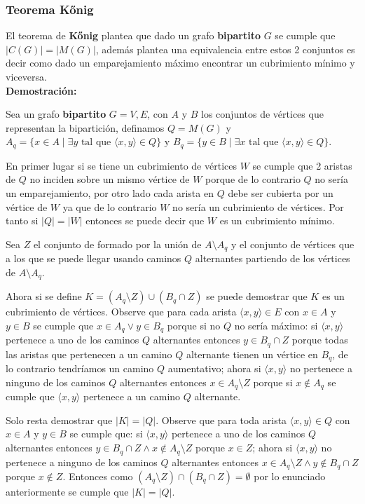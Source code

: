 \documentclass{article}
\begin{document}
\subsubsection{Teorema Kőnig}

El teorema de \textbf{Kőnig} plantea que dado un grafo \textbf{bipartito} $G$ se cumple que $|C(G)|=|M(G)|$, además plantea una equivalencia
entre estos 2 conjuntos es decir como dado un emparejamiento máximo encontrar un cubrimiento mínimo y viceversa.\\

\textbf{Demostración:}

Sea un grafo \textbf{bipartito} $G=V,E$, con $A$ y $B$ los conjuntos de vértices que representan la bipartición, definamos $Q = M(G)$ y
$A_q = \{ x \in A \mid \exists y \text{ tal que } \langle x, y \rangle \in Q \}$
y $B_q = \{ y \in B \mid \exists x \text{ tal que } \langle x, y \rangle \in Q \}$.

En primer lugar si se tiene un cubrimiento de vértices $W$ se cumple que 2 aristas de $Q$ no inciden
sobre un mismo vértice de $W$ porque de lo contrario $Q$ no sería un emparejamiento, por otro lado cada arista en $Q$ debe ser
cubierta por un vértice de $W$ ya que de lo contrario $W$ no sería un cubrimiento de vértices. Por tanto si $|Q|=|W|$ entonces se puede
decir que $W$ es un cubrimiento mínimo.

Sea $Z$ el conjunto de formado por la unión de $A \setminus A_q$ y el conjunto de vértices que a los que se puede llegar usando
caminos $Q$ alternantes partiendo de los vértices de $A \setminus A_q$.

Ahora si se define $K = (A_q\setminus Z) \cup (B_q \cap Z)$ se puede demostrar que $K$ es un cubrimiento de vértices. Observe que
para cada arista $\langle x, y \rangle \in E$ con $x\in A$ y $y\in B$ se cumple que $x \in A_q \vee y \in B_q$ porque si no $Q$
no sería máximo: si $\langle x, y \rangle$ pertenece a uno de los caminos $Q$ alternantes entonces $y \in B_q \cap Z$ porque todas las aristas
que pertenecen a un camino $Q$ alternante tienen un vértice en $B_q$, de lo contrario tendríamos un camino $Q$ aumentativo; ahora si $\langle x, y \rangle$
no pertenece a ninguno de los caminos $Q$ alternantes entonces $x \in A_q\setminus Z$ porque si $x \notin A_q$ se cumple que $\langle x, y \rangle$
pertenece a un camino $Q$ alternante.

Solo resta demostrar que $|K|=|Q|$. Observe que para toda arista $\langle x, y \rangle \in Q$ con $x\in A$ y $y\in B$
se cumple que: si $\langle x, y \rangle$ pertenece a uno de los caminos $Q$ alternantes entonces $y \in B_q \cap Z \wedge x \notin A_q\setminus Z$ porque $x\in Z$;
ahora si $\langle x, y \rangle$ no pertenece a ninguno de los caminos $Q$ alternantes entonces $x \in A_q\setminus Z \wedge y \notin B_q \cap Z$ porque $x \notin Z$.
Entonces como $(A_q\setminus Z) \cap (B_q \cap Z)= \emptyset$ por lo enunciado anteriormente se cumple que $|K|=|Q|$.
\end{document}
